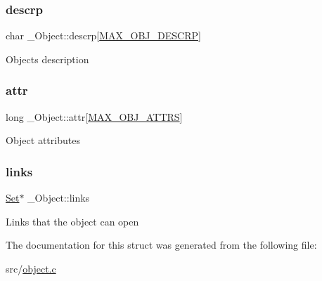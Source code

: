 \subsubsection{\texorpdfstring{descrp}{descrp}}
{\footnotesize\ttfamily char \+\_\+\+Object\+::descrp\mbox{[}\hyperlink{object_8h_a9c396da2f3b9f0191120ff1666af6381}{M\+A\+X\+\_\+\+O\+B\+J\+\_\+\+D\+E\+S\+C\+RP}\mbox{]}}

Object\textquotesingle{}s description \mbox{\label{struct__Object_a9074217e572100d1259487a818bb0a0a}} 
\subsubsection{\texorpdfstring{attr}{attr}}
{\footnotesize\ttfamily long \+\_\+\+Object\+::attr\mbox{[}\hyperlink{object_8h_a6b252b064231d7dc71c194dfea24b32b}{M\+A\+X\+\_\+\+O\+B\+J\+\_\+\+A\+T\+T\+RS}\mbox{]}}

Object attributes \mbox{\label{struct__Object_afd29bc78dd0fc104db1aab87c6fc7d5c}} 
\subsubsection{\texorpdfstring{links}{links}}
{\footnotesize\ttfamily \hyperlink{set_8h_a6d3b7f7c92cbb4577ef3ef7ddbf93161}{Set}$\ast$ \+\_\+\+Object\+::links}

Links that the object can open 

The documentation for this struct was generated from the following file\+:\begin{DoxyCompactItemize}
\item 
src/\hyperlink{object_8c}{object.\+c}\end{DoxyCompactItemize}
